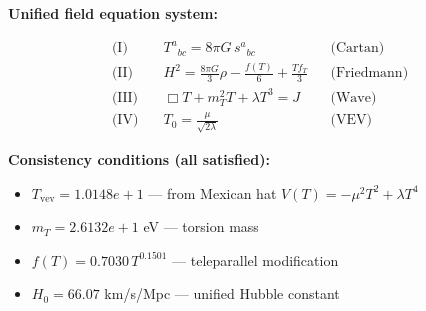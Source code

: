
\textbf{Unified field equation system:}

\begin{align}
  \text{(I)} \quad & T^a{}_{bc} = 8\pi G \, s^a{}_{bc} && \text{(Cartan)} \\
  \text{(II)} \quad & H^2 = \frac{8\pi G}{3}\rho - \frac{f(T)}{6} + \frac{Tf_T}{3} && \text{(Friedmann)} \\
  \text{(III)} \quad & \Box T + m_T^2 T + \lambda T^3 = J && \text{(Wave)} \\
  \text{(IV)} \quad & T_0 = \frac{\mu}{\sqrt{2\lambda}} && \text{(VEV)}
\end{align}

\textbf{Consistency conditions (all satisfied):}
\begin{itemize}
  \item $T_{\text{vev}} = 1.0148e+1$ — from Mexican hat $V(T) = -\mu^2 T^2 + \lambda T^4$
  \item $m_T = 2.6132e+1$ eV — torsion mass
  \item $f(T) = 0.7030 \, T^{0.1501}$ — teleparallel modification
  \item $H_0 = 66.07$ km/s/Mpc — unified Hubble constant
\end{itemize}
